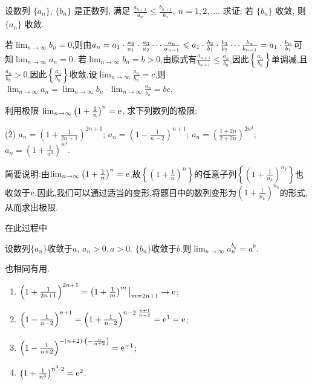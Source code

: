 \begin{exercise}[1.2.21]
    设数列 $\{a_n\}$, $\{b_n\}$ 是正数列, 满足 $\frac{a_{n+1}}{a_n} \le \frac{b_{n+1}}{b_n}, \ n=1, 2, \ldots$. 求证: 若 $\{b_n\}$ 收敛, 则 $\{a_n\}$ 收敛.
\end{exercise}

\begin{solution}
    若$\lim_{n\to\infty} b_n = 0$,则由$a_n = a_1 \cdot \frac{a_2}{a_1} \cdot \frac{a_3}{a_2} \cdots \frac{a_n}{a_{n-1}} \leqslant a_1 \cdot \frac{b_2}{b_1} \cdot \frac{b_3}{b_2} \cdots \frac{b_n}{b_{n-1}} = a_1 \cdot \frac{b_n}{b_1}$可知$\lim_{n\to\infty} a_n = 0$.
    若$\lim_{n\to\infty} b_n = b > 0$,由原式有$\frac{a_{n+1}}{b_{n+1}} \le \frac{a_n}{b_n}$,因此$\left\{ \frac{a_n}{b_n} \right\}$单调减,且$\frac{a_n}{b_n} > 0$,因此$\left\{ \frac{a_n}{b_n} \right\}$收敛,设$\lim_{n\to\infty} \frac{a_n}{b_n} = c$,则$\lim_{n\to\infty} a_n = \lim_{n\to\infty} b_n \cdot \lim_{n\to\infty} \frac{a_n}{b_n} = bc$.
\end{solution}

\begin{exercise}[1.2.22]
    利用极限 $\lim_{n\to\infty} \left(1 + \frac{1}{n}\right)^n = \mathrm{e}$, 求下列数列的极限:
    \begin{tasks}[label=(\arabic*)](2)
        \task $a_n = \left(1 + \frac{1}{2n+1}\right)^{2n+1}$;
        \task $a_n = \left(1 - \frac{1}{n-2}\right)^{n+1}$;
        \task $a_n = \left(\frac{1+2n}{2+2n}\right)^{2n^3}$;
        \task $a_n = \left(1 + \frac{1}{n^3}\right)^{n^3}$.
    \end{tasks}
\end{exercise}

简要说明:由$\lim_{n\to\infty} \left(1 + \frac{1}{n}\right)^n = \mathrm{e}$,故$\left\{ \left(1 + \frac{1}{n}\right)^n \right\}$的任意子列$\left\{ \left(1 + \frac{1}{n_k}\right)^{n_k} \right\}$也收敛于$\mathrm{e}$.因此,我们可以通过适当的变形,将题目中的数列变形为$\left(1 + \frac{1}{n_k}\right)^{n_k}$的形式,从而求出极限.

在此过程中
\begin{proposition*}
    设数列$\{a_n\}$收敛于$a$, $a_n > 0, a > 0$. $\{b_n\}$收敛于$b$.则$\lim_{n \to \infty} a_n^{b_n} = a^b$.
\end{proposition*}
也相同有用.


\begin{solution}
    \begin{enumerate}[(1)]
        \item $\left(1 + \frac{1}{2n+1}\right)^{2n+1} = \left(1 + \frac{1}{m}\right)^m \big|_{m=2n+1} \to \mathrm{e}$;
    \item $\left(1 - \frac{1}{n-2}\right)^{n+1} = \left(1 + \frac{1}{n-2}\right)^{{n-2} \cdot \frac{n+1}{n-2}} = \mathrm{e}^1 = \mathrm{e}$;
    \item $\left(1 - \frac{1}{n+2} \right)^{-{(n+2)} \cdot \left( - \frac{n}{n+2} \right)} = \mathrm{e}^{-1}$;
    \item $\left(1 + \frac{1}{n^3}\right)^{n^3 \cdot 2} = \mathrm{e}^2$.
    \end{enumerate}
\end{solution}

